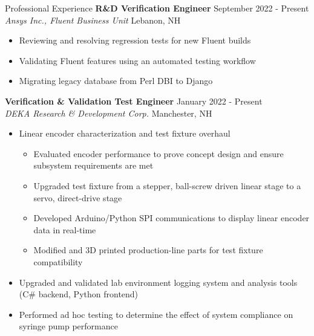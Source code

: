 \documentclass{resume}
\begin{document}
\begin{rSection}{Professional Experience}
    {\bf R\&D Verification Engineer} \hfill {September 2022 - Present}
    \\{\em Ansys Inc., Fluent Business Unit} \hfill {Lebanon, NH}
    \vspace{-0.5em}
    \begin{itemize}[label={\tiny\raisebox{1ex}{\textbullet}}, noitemsep]
        \item Reviewing and resolving regression tests for new Fluent builds
        \item Validating Fluent features using an automated testing workflow
        \item Migrating legacy database from Perl DBI to Django
    \end{itemize}
    \vspace{-0.4em}
    {\bf Verification \& Validation Test Engineer} \hfill {January 2022 - Present}
    \\{\em DEKA Research \& Development Corp.} \hfill {Manchester, NH}
    \vspace{-0.5em}
    \begin{itemize}[label={\tiny\raisebox{1ex}{\textbullet}}, noitemsep]
        \item Linear encoder characterization and test fixture overhaul
              \begin{itemize}[label={\tiny\raisebox{1ex}{\textbullet}}, noitemsep]
                  \item Evaluated encoder performance to prove concept design and ensure subsystem requirements are met
                  \item Upgraded test fixture from a stepper, ball-screw driven linear stage to a servo, direct-drive stage
                  \item Developed Arduino/Python SPI communications to display linear encoder data in real-time
                  \item Modified and 3D printed production-line parts for test fixture compatibility
              \end{itemize}
        \item Upgraded and validated lab environment logging system and analysis tools (C\# backend, Python frontend)
        \item Performed ad hoc testing to determine the effect of system compliance on syringe pump performance
    \end{itemize}
    \vspace{-0.4em}

\end{rSection}
\end{document}
